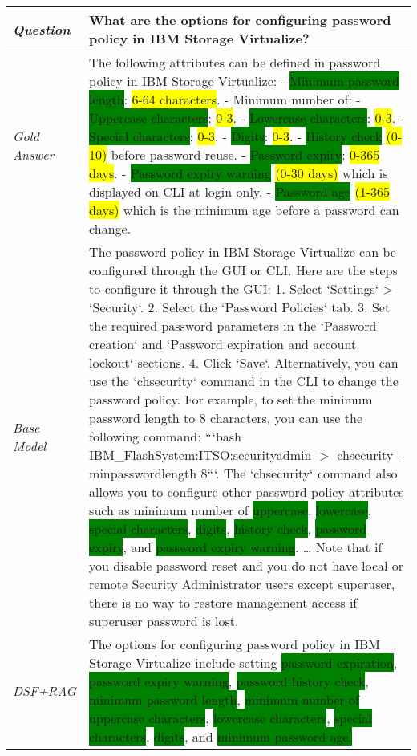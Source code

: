 \begin{table}
	\centering
	\renewcommand{\arraystretch}{1.5}
	\begin{tabular}{l|p{13cm}}
	\toprule
 \textit{Question}&What are the options for configuring password policy in IBM Storage Virtualize?\\ \midrule
 \textit{Gold Answer}& The following attributes can be defined in password policy in IBM Storage Virtualize:
    - \colorbox{green}{Minimum password length}: \colorbox{yellow}{6-64 characters}.
    - Minimum number of:
    - \colorbox{green}{Uppercase characters}: \colorbox{yellow}{0-3}.
    - \colorbox{green}{Lowercase characters}: \colorbox{yellow}{0-3}.
    - \colorbox{green}{Special characters}: \colorbox{yellow}{0-3}.
    - \colorbox{green}{Digits}: \colorbox{yellow}{0-3}.
    - \colorbox{green}{History check} \colorbox{yellow}{(0-10)} before password reuse.
    - \colorbox{green}{Password expiry}: \colorbox{yellow}{0-365 days}.
    - \colorbox{green}{Password expiry warning} \colorbox{yellow}{(0-30 days)} which is displayed on CLI at login only.
    - \colorbox{green}{Password age} \colorbox{yellow}{(1-365 days)} which is the minimum age before a password can change. \\ \midrule
 \textit{Base Model} & The password policy in IBM Storage Virtualize can be configured through the GUI or CLI. Here are the steps to configure it through the GUI:
    1. Select `Settings` > `Security`. 2. Select the `Password Policies` tab. 3. Set the required password parameters in the `Password creation` and `Password expiration and account lockout` sections. 4. Click `Save`. Alternatively, you can use the `chsecurity` command in the CLI to change the password policy. For example, to set the minimum password length to 8 characters, you can use the following command: 
    ```bash IBM\_FlashSystem:ITSO:securityadmin $>$ chsecurity -minpasswordlength 8```. The `chsecurity` command also allows you to configure other password policy attributes such as minimum number of \colorbox{green}{uppercase}, \colorbox{green}{lowercase}, \colorbox{green}{special characters}, \colorbox{green}{digits}, \colorbox{green}{history check}, \colorbox{green}{password expiry}, and \colorbox{green}{password expiry warning}. 
    \dots
    Note that if you disable password reset and you do not have local or remote Security Administrator users except superuser, there is no way to restore management access if superuser password is lost.\\
\midrule
\textit{DSF+RAG} & The options for configuring password policy in IBM Storage Virtualize include setting \colorbox{green}{password expiration}, \colorbox{green}{password expiry warning}, \colorbox{green}{password history check}, \colorbox{green}{minimum password length}, \colorbox{green}{minimum number of uppercase characters}, \colorbox{green}{lowercase characters}, \colorbox{green}{special characters}, \colorbox{green}{digits}, and \colorbox{green}{minimum password age.} \\ \midrule

\end{tabular}
\end{table}
